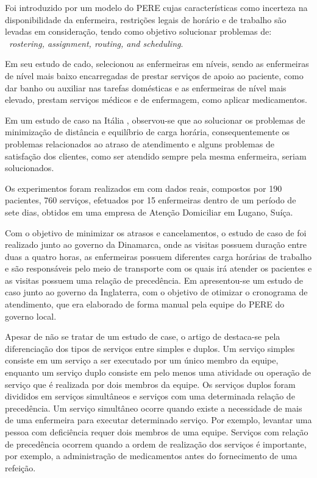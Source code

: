 Foi introduzido por \cite{nguyen:2016} um modelo do \ac{PERE} cujas características como incerteza na disponibilidade da enfermeira, restrições legais de horário e de trabalho são levadas em consideração, tendo como objetivo solucionar problemas de: ~\textit{rostering, assignment, routing, and scheduling}.

Em seu estudo de cado, \cite{trautsamwieser:2014} selecionou as enfermeiras em níveis, sendo as enfermeiras de nível mais baixo encarregadas de prestar serviços de apoio ao paciente, como dar banho ou auxiliar nas tarefas domésticas e as enfermeiras de nível mais elevado, prestam serviços médicos e de enfermagem, como aplicar medicamentos.

%
%

Em um estudo de caso na Itália \cite{cattafi:2012}, observou-se que ao solucionar os problemas de minimização de distância e equilíbrio de carga horária, consequentemente os problemas relacionados ao atraso de atendimento e alguns problemas de satisfação dos clientes, como ser atendido sempre pela mesma enfermeira, seriam solucionados.

Os experimentos foram realizados em \cite{nguyen:2016} com dados reais, compostos por 190 pacientes, 760 serviços, efetuados por 15 enfermeiras dentro de um período de sete dias, obtidos em uma empresa de Atenção Domiciliar em Lugano, Suíça.

Com o objetivo de minimizar os atrasos e cancelamentos, o estudo de caso de \cite{rasmussenm:2012} foi realizado junto ao governo da Dinamarca, onde as visitas possuem duração entre duas a quatro horas, as enfermeiras possuem diferentes carga horárias de trabalho e são responsáveis pelo meio de transporte com os quais irá atender os pacientes e as visitas possuem uma relação de precedência. Em \cite{drake:2007} apresentou-se um estudo de caso junto ao governo da Inglaterra, 
com o objetivo de otimizar o cronograma de atendimento, que era elaborado de forma manual pela equipe do \ac{PERE} do governo local.

Apesar de não se tratar de um estudo de case, o artigo de \cite{Bierwirth:2013} destaca-se pela diferenciação dos tipos de serviços entre simples e duplos. 
Um serviço simples consiste em um serviço a ser executado por um único membro da equipe, enquanto um serviço duplo consiste em pelo menos uma atividade ou operação de serviço que é realizada por dois membros da equipe. 
Os serviços duplos foram divididos em serviços simultâneos e serviços com uma determinada relação de precedência.  
Um serviço simultâneo ocorre quando existe a necessidade de mais de uma enfermeira para executar determinado serviço. Por exemplo, levantar uma pessoa com deficiência requer dois membros de uma equipe. 
Serviços com relação de precedência ocorrem quando a ordem de realização dos serviços é importante, por exemplo, a administração de medicamentos antes do fornecimento de uma refeição.
